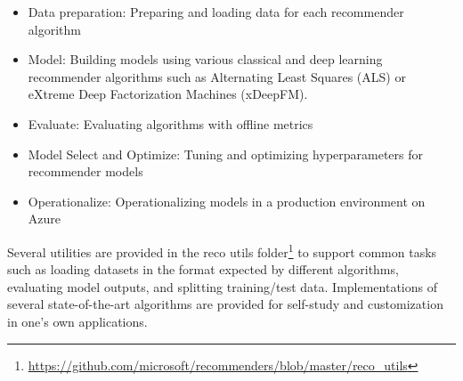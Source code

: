 \begin{itemize}
\item Data preparation: Preparing and loading data for each recommender algorithm
\item Model: Building models using various classical and deep learning recommender algorithms such as Alternating Least Squares (ALS) or eXtreme Deep Factorization Machines (xDeepFM).
\item Evaluate: Evaluating algorithms with offline metrics
\item Model Select and Optimize: Tuning and optimizing hyperparameters for recommender models
\item Operationalize: Operationalizing models in a production environment on Azure
\end{itemize}

Several utilities are provided in the 
reco utils folder\footnote{\url{https://github.com/microsoft/recommenders/blob/master/reco_utils}} 
to support common tasks such as loading datasets in the format expected by 
different algorithms, evaluating model outputs, and splitting training/test data. 
Implementations of several state-of-the-art algorithms are provided for self-study and 
customization in one's own applications.

